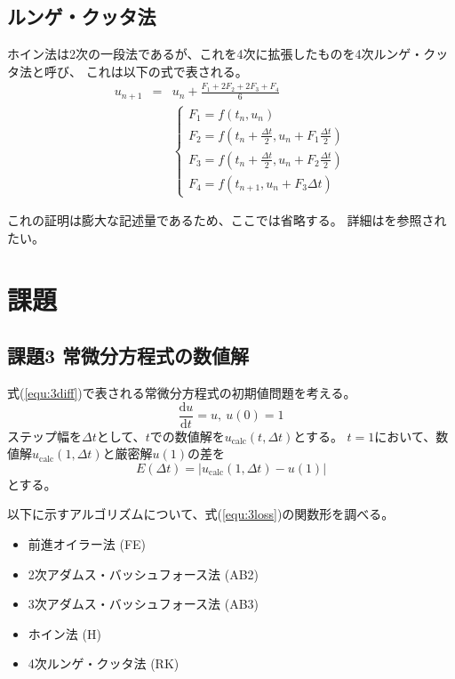 \documentclass[a4j, titlepage]{jsarticle}
\numberwithin{equation}{section}
\begin{document}
    \subsection{ルンゲ・クッタ法}
        ホイン法は2次の一段法であるが、これを4次に拡張したものを4次ルンゲ・クッタ法と呼び、
        これは以下の式で表される。
        \begin{eqnarray}
            u_{n+1} &=& u_n + \frac{F_1 + 2F_2 + 2F_3 + F_4}{6} \\
            &&\begin{cases}
                F_1 = f(t_n, u_n) \\
                F_2 = \displaystyle f(t_n + \frac{\Delta t}{2}, u_n + F_1\frac{\Delta t}{2}) \\
                F_3 = \displaystyle f(t_n + \frac{\Delta t}{2}, u_n + F_2\frac{\Delta t}{2}) \\
                F_4 = f(t_{n+1}, u_n + F_3\Delta t)
            \end{cases}
        \end{eqnarray}

        これの証明は膨大な記述量であるため、ここでは省略する。
        詳細は\cite{runge}を参照されたい。

\section{課題} \label{sec:ex}
    \subsection{課題3 常微分方程式の数値解}
        式(\ref{equ:3diff})で表される常微分方程式の初期値問題を考える。
        \begin{equation}
            \frac{\mathrm{d}u}{\mathrm{d}t}=u, \ u(0)=1 \label{equ:3diff}
        \end{equation}
        ステップ幅を$\Delta t$として、$t$での数値解を$u_\mathrm{calc}(t, \Delta t)$とする。
        $t=1$において、数値解$u_\mathrm{calc}(1, \Delta t)$と厳密解$u(1)$の差を
        \begin{equation}
            E(\Delta t) = |u_\mathrm{calc}(1, \Delta t) - u(1)| \label{equ:3loss}
        \end{equation}
        とする。

        以下に示すアルゴリズムについて、式(\ref{equ:3loss})の関数形を調べる。
        \begin{itemize}
            \item 前進オイラー法 (FE)
            \item 2次アダムス・バッシュフォース法 (AB2)
            \item 3次アダムス・バッシュフォース法 (AB3)
            \item ホイン法 (H)
            \item 4次ルンゲ・クッタ法 (RK)
        \end{itemize}
\end{document}
